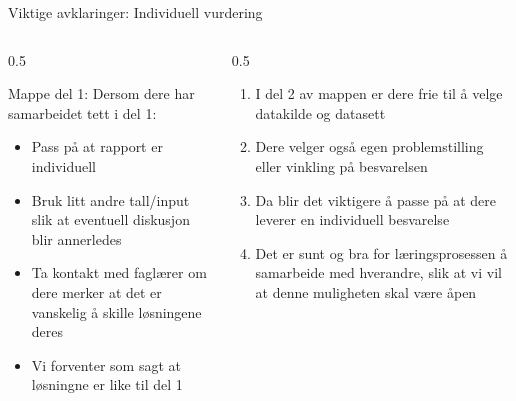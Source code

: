 \documentclass[aspectratio=169]{beamer}
\begin{document}
\begin{frame}{Viktige avklaringer: Individuell vurdering}
   \begin{columns}
      
      \begin{column}{0.5\textwidth}
         \begin{block}{Mappe del 1:}
            Dersom dere har samarbeidet tett i del 1:
            \begin{itemize}
               \item {Pass på at rapport er individuell}
               \item {Bruk litt andre tall/input slik at eventuell diskusjon blir annerledes}
               \item {Ta kontakt med faglærer om dere merker at det er vanskelig å skille løsningene deres}
               \item {Vi forventer som sagt at løsningne er like til del 1}
            \end{itemize}
         \end{block}
      \end{column}
      
      \begin{column}{0.5\textwidth}
         \begin{enumerate}[$\bullet$]
            \item {I del 2 av mappen er dere frie til å velge datakilde og datasett}
            \item {Dere velger også egen problemstilling eller vinkling på besvarelsen}
            \item {Da blir det viktigere å passe på at dere leverer en individuell besvarelse}
            \item {Det er sunt og bra for læringsprosessen å samarbeide med hverandre, slik at vi vil at denne muligheten skal være åpen}
         \end{enumerate}
      \end{column}
   \end{columns}
\end{frame}
\end{document}
